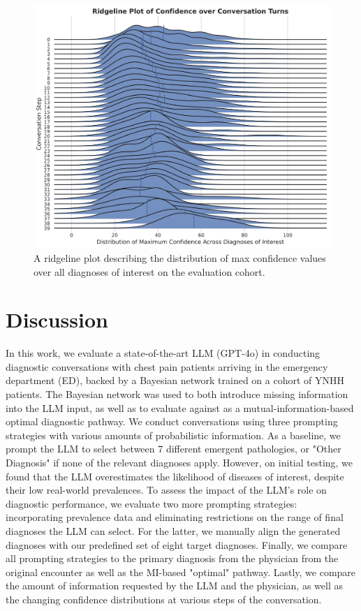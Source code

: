 \begin{figure}[H]
    \centering
	\includegraphics[width=\textwidth] {figures/aim3/confidence_over_steps.png}
	\caption{A ridgeline plot describing the distribution of max confidence values over all diagnoses of interest on the evaluation cohort.} \label{fig:aim3-confidence-steps}
\end{figure}    

\section{Discussion}
In this work, we evaluate a state-of-the-art LLM (GPT-4o) in conducting diagnostic conversations with chest pain patients arriving in the emergency department (ED), backed by a Bayesian network trained on a cohort of YNHH patients. The Bayesian network was used to both introduce missing information into the LLM input, as well as to evaluate against as a mutual-information-based optimal diagnostic pathway. We conduct conversations using three prompting strategies with various amounts of probabilistic information. As a baseline, we prompt the LLM to select between 7 different emergent pathologies, or "Other Diagnosis" if none of the relevant diagnoses apply. However, on initial testing, we found that the LLM overestimates the likelihood of diseases of interest, despite their low real-world prevalences. To assess the impact of the LLM's role on diagnostic performance, we evaluate two more prompting strategies: incorporating prevalence data and eliminating restrictions on the range of final diagnoses the LLM can select. For the latter, we manually align the generated diagnoses with our predefined set of eight target diagnoses. Finally, we compare all prompting strategies to the primary diagnosis from the physician from the original encounter as well as the MI-based "optimal" pathway. Lastly, we compare the amount of information requested by the LLM and the physician, as well as the changing confidence distributions at various steps of the conversation. 

